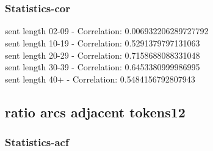 \documentclass{article}%
\begin{document}
\begin{figure}[ht]%
\centering%
\setlength{\abovecaptionskip}{-35pt}%
%
%
\\%
%
%
\\%
%
\end{figure}

%
\newpage%
\subsubsection{Statistics{-}cor}%
\label{ssubsec:Statistics{-}cor}%
\noindent%
sent length 02-09 - Correlation: 0.006932206289727792\\%
sent length 10-19 - Correlation: 0.5291379797131063\\%
sent length 20-29 - Correlation: 0.7158688088331048\\%
sent length 30-39 - Correlation: 0.6453380999986995\\%
sent length 40+ - Correlation: 0.5484156792807943\\

%
\newpage

%
\subsection{ratio arcs adjacent tokens12}%
\label{subsec:ratioarcsadjacenttokens12}%
\subsubsection{Statistics{-}acf}%
\label{ssubsec:Statistics{-}acf}%
\end{document}
